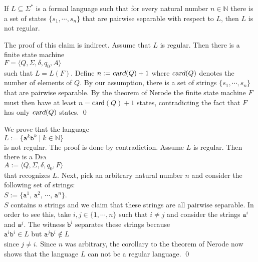 \begin{Corollary}
If $L \subseteq \Sigma^*$ is a formal language such that for every natural number $n \in \mathbb{N}$
there is a set of states $\{ s_1, \cdots, s_n \}$ that are pairwise separable with respect to $L$,
then $L$ is not regular. 
\end{Corollary}

\proofEng
The proof of this claim is indirect.  Assume that $L$ is regular.  Then there is a finite state machine
\\[0.2cm]
\hspace*{1.3cm}
$F = \langle Q, \Sigma, \delta, q_0, A \rangle$
\\[0.2cm]
such that $L = L(F)$.  Define $n := \textsl{card}(Q) + 1$
where $\textsl{card}(Q)$ denotes the number of elements of $Q$.  By our assumption, there is a set
of strings $\{ s_1, \cdots, s_n \}$ that are pairwise separable.  By the theorem of
Nerode the finite state machine $F$ must then have at least $n = \textsf{card}(Q) +1$ states,
contradicting the fact that $F$ has only $\textsl{card}(Q)$ states.
\qed


\exampleEng
We prove that the language 
\\[0.2cm]
\hspace*{1.3cm}
$L := \{ \mathtt{a}^k\mathtt{b}^k \mid k \in \mathbb{N} \}$
\\[0.2cm]
is not regular.  The proof is done by contradiction.  Assume $L$ is regular.  Then there
is a \textsc{Dfa} 
\\[0.2cm]
\hspace*{1.3cm}
$A := \langle Q, \Sigma, \delta, q_0, F \rangle$ 
\\[0.2cm]
that recognizes $L$. Next, pick an arbitrary natural number $n$ and consider the following
set of strings: 
\\[0.2cm]
\hspace*{1.3cm}
$S := \{ \mathtt{a}^1,\, \mathtt{a}^2,\, \cdots,\, \mathtt{a}^n \}$.
\\[0.2cm]
$S$ contains $n$ strings and we claim that these strings are all pairwise separable.
In order to see this, take $i,j \in \{ 1,\cdots,n \}$ such that $i \not= j$ and consider
the strings $\mathtt{a}^i$ and $\mathtt{a}^j$.  The witness $\mathtt{b}^i$ separates these
strings because
\\[0.2cm]
\hspace*{1.3cm}
$\mathtt{a}^i\mathtt{b}^i \in L$ \quad but \quad $\mathtt{a}^j\mathtt{b}^i \not\in L$
\\[0.2cm]
since $j \not= i$.  Since $n$ was arbitrary, the corollary to the theorem of Nerode now shows that
the language $L$ can not be a regular language. 
\qed

